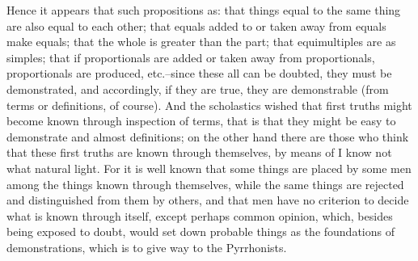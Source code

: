 \documentclass[twoside,openright]{article}
\begin{document}
Hence it appears that such propositions as: that things equal to the same
thing are also equal to each other; that equals added to or taken away from
equals make equals; that the whole is greater than the part; that
equimultiples are as simples; that if proportionals are added or taken away
from proportionals, proportionals are produced, etc.\---since these all can
be doubted, they must be demonstrated, and accordingly, if they are true, they
are demonstrable (from terms or definitions, of course).  And the scholastics
wished that first truths might become known through inspection of terms, that
is that they might be easy to demonstrate and almost definitions; on the other
hand there are those who think that these first truths are known through
themselves, by means of I know not what natural light.  For it is well known
that some things are placed by some men among the things known through
themselves, while the same things are rejected and distinguished from them by
others, and that men have no criterion to decide what is known through itself,
except perhaps common opinion, which, besides being exposed to doubt, would
set down probable things as the foundations of demonstrations, which is to
give way to the Pyrrhonists.
\end{document}
